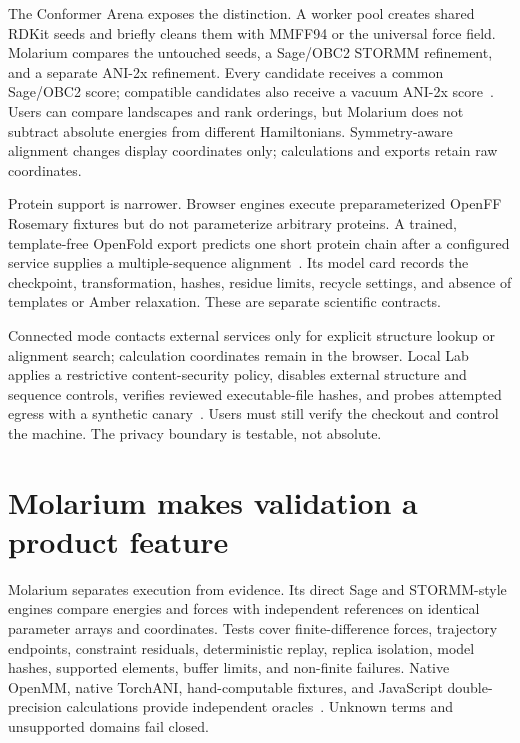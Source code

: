 \documentclass[10pt]{article}
\begin{document}
The Conformer Arena exposes the distinction.
A worker pool creates shared RDKit seeds and briefly cleans them with MMFF94 or the universal force field.
Molarium compares the untouched seeds, a Sage/OBC2 STORMM refinement, and a separate ANI-2x refinement.
Every candidate receives a common Sage/OBC2 score; compatible candidates also receive a vacuum ANI-2x score~\cite{gao2020torchani}.
Users can compare landscapes and rank orderings, but Molarium does not subtract absolute energies from different Hamiltonians.
Symmetry-aware alignment changes display coordinates only; calculations and exports retain raw coordinates.

Protein support is narrower.
Browser engines execute preparameterized OpenFF Rosemary fixtures but do not parameterize arbitrary proteins.
A trained, template-free OpenFold export predicts one short protein chain after a configured service supplies a multiple-sequence alignment~\cite{ahdritz2024openfold}.
Its model card records the checkpoint, transformation, hashes, residue limits, recycle settings, and absence of templates or Amber relaxation.
These are separate scientific contracts.

Connected mode contacts external services only for explicit structure lookup or alignment search; calculation coordinates remain in the browser.
Local Lab applies a restrictive content-security policy, disables external structure and sequence controls, verifies reviewed executable-file hashes, and probes attempted egress with a synthetic canary~\cite{molarium2026}.
Users must still verify the checkout and control the machine.
The privacy boundary is testable, not absolute.

\section*{Molarium makes validation a product feature}

Molarium separates execution from evidence.
Its direct Sage and STORMM-style engines compare energies and forces with independent references on identical parameter arrays and coordinates.
Tests cover finite-difference forces, trajectory endpoints, constraint residuals, deterministic replay, replica isolation, model hashes, supported elements, buffer limits, and non-finite failures.
Native OpenMM, native TorchANI, hand-computable fixtures, and JavaScript double-precision calculations provide independent oracles~\cite{molarium2026}.
Unknown terms and unsupported domains fail closed.
\end{document}
